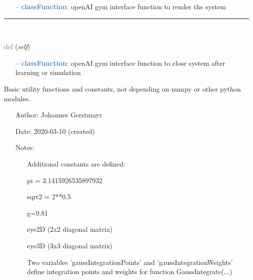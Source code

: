 \begin{itemize}[leftmargin=1.4cm]
\begin{itemize}[leftmargin=1.4cm]
\begin{itemize}[leftmargin=0.7cm]
\item[--]\textcolor{steelblue}{\bf classFunction}: openAI gym interface function to render the system
\vspace{12pt}\end{itemize}
%
\noindent\rule{8cm}{0.75pt}\vspace{1pt} \\ 
\begin{flushleft}
\noindent \textcolor{steelblue}{def {\bf {}}}\label{sec:artificialIntelligence:OpenAIGymInterfaceEnv(Env):close}
({\it self})
\end{flushleft}
\setlength{\itemindent}{0.7cm}
\begin{itemize}[leftmargin=0.7cm]
\item[--]\textcolor{steelblue}{\bf classFunction}: openAI gym interface function to close system after learning or simulation
\vspace{12pt}\end{itemize}
%
\label{sec:module:basicUtilities}
  Basic utility functions and constants, not depending on numpy or other python modules.
\begin{itemize}[leftmargin=1.4cm]
\setlength{\itemindent}{-1.4cm}
\item[]Author:    Johannes Gerstmayr
\item[]Date:      2020-03-10 (created)
\item[]Notes:
\vspace{-22pt}\begin{itemize}[leftmargin=0.5cm]
\setlength{\itemindent}{-0.5cm}
\item[]    Additional constants are defined: 
\item[]            pi = 3.1415926535897932 
\item[]            sqrt2 = 2**0.5
\item[]            g=9.81
\item[]            eye2D (2x2 diagonal matrix)
\item[]            eye3D (3x3 diagonal matrix)
\item[]            Two variables 'gaussIntegrationPoints' and 'gaussIntegrationWeights' define integration points and weights for function GaussIntegrate(...) 
\ei
\ei
\begin{flushleft}
\label{sec:basicUtilities:ClearWorkspace}

\end{flushleft}
\end{itemize}
\end{itemize}
\end{itemize}
\end{itemize}
